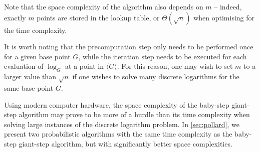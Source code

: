 Note that the space complexity of the algorithm also depends on $m$ -- indeed, exactly $m$ points are stored in the lookup table, or $\Theta(\sqrt{n})$ when optimising for the time complexity.

It is worth noting that the precomputation step only needs to be performed once for a given base point $G$, while the iteration step needs to be executed for each evaluation of $\log_G$ at a point in $\langle G \rangle$. For this reason, one may wish to set $m$ to a larger value than $\sqrt{n}$ if one wishes to solve many discrete logarithms for the same base point $G$.

Using modern computer hardware, the space complexity of the baby-step giant-step algorithm may prove to be more of a hurdle than its time complexity when solving large instances of the discrete logarithm problem. In \cref{sec:pollard}, we present two probabilistic algorithms with the same time complexity as the baby-step giant-step algorithm, but with significantly better space complexities.
